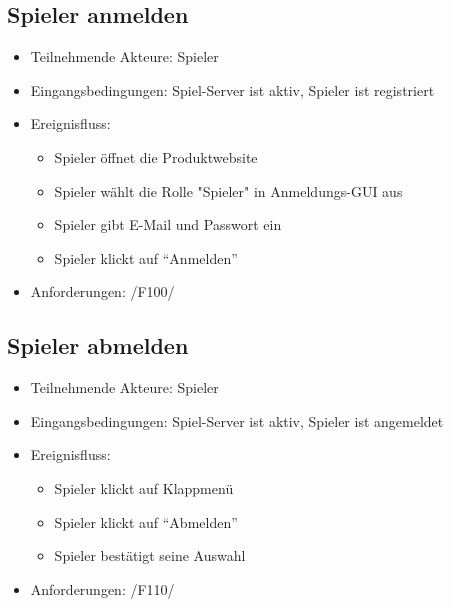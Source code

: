 \documentclass[a4paper]{scrreprt}
\begin{document}
    \subsection{Spieler anmelden}
    \begin{itemize}
        \item Teilnehmende Akteure: \Gls{Spieler}

        \item Eingangsbedingungen: \Gls{Spiel-Server} ist aktiv, \Gls{Spieler} ist registriert

        \item Ereignisfluss:
        \begin{itemize}
            \item \Gls{Spieler} öffnet die Produktwebsite
            \item \Gls{Spieler} wählt die Rolle "\Gls{Spieler}" in Anmeldungs-GUI aus
            \item \Gls{Spieler} gibt E-Mail und Passwort ein
            \item \Gls{Spieler} klickt auf \enquote{Anmelden}
        \end{itemize}
        \item Anforderungen: /F100/
    \end{itemize}

    \subsection{Spieler abmelden}
    \begin{itemize}
        \item Teilnehmende Akteure: \Gls{Spieler}
        \item Eingangsbedingungen: \Gls{Spiel-Server} ist aktiv, \Gls{Spieler} ist angemeldet
        \item Ereignisfluss:
        \begin{itemize}
            \item \Gls{Spieler} klickt auf Klappmenü
            \item \Gls{Spieler} klickt auf \enquote{Abmelden}
            \item \Gls{Spieler} bestätigt seine Auswahl
        \end{itemize}
        \item Anforderungen: /F110/
    \end{itemize}
\end{document}
